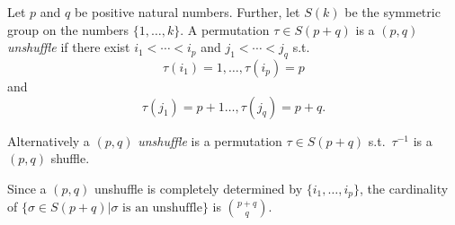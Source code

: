 \documentclass[12pt]{article}
\begin{document}
Let $p$ and $ q$ be positive natural numbers. Further, let $S(k)$ be the symmetric group on the numbers $ \{1,\ldots, k\}$. A permutation $ \tau\in S(p+q)$ is a $ (p,q)$ \emph{unshuffle} if there exist $i_1 < \cdots < i_p $ and $j_1 < \cdots <  j_q $ s.t.
\[
\tau(i_1)=1, \ldots ,\tau(i_p)=p
\]
and
\[
\tau(j_1)=p+1 \ldots ,  \tau(j_q)=p+q.
\]

Alternatively a $(p,q)$ \emph{unshuffle} is a permutation $ \tau\in S(p+q)$ s.t.~$\tau^{-1}$ is a $(p,q)$ shuffle.

Since a $ (p,q)$ unshuffle is completely determined by $\{i_1,\ldots ,i_p \}$, the cardinality of $\{\sigma\in S(p+q)|\mbox{$\sigma$ is an unshuffle}\}$ is $\binom{p+q}{q}$.
\end{document}
